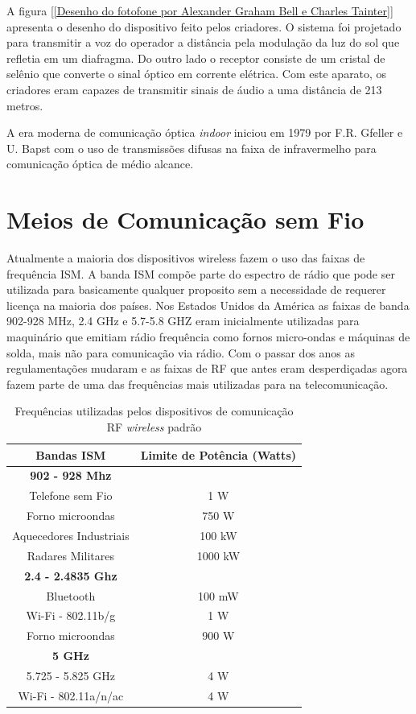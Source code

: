 A figura [\ref{Desenho do fotofone por Alexander Graham Bell e Charles Tainter}] apresenta o desenho do dispositivo feito pelos criadores. O sistema foi projetado para transmitir a voz do operador a distância pela modulação da luz do sol que refletia em um diafragma. Do outro lado o receptor consiste de um cristal de selênio que converte o sinal óptico em corrente elétrica. Com este aparato, os criadores eram capazes de transmitir sinais de áudio a uma distância de 213 metros. \cite{Fotofone}

A era moderna de comunicação óptica \textit{indoor} iniciou em 1979 por F.R. Gfeller e U. Bapst com o uso de transmissões difusas na faixa de infravermelho para comunicação óptica de médio alcance.\cite{Gfeller}


\section{Meios de Comunicação sem Fio}

Atualmente a maioria dos dispositivos wireless fazem o uso das faixas de frequência ISM.
A banda ISM compõe parte do espectro de rádio que pode ser utilizada para basicamente qualquer proposito sem a necessidade de requerer licença na maioria dos países. Nos Estados Unidos da América as faixas de banda 902-928 MHz, 2.4 GHz e 5.7-5.8 GHZ eram inicialmente utilizadas para maquinário que emitiam rádio frequência como fornos micro-ondas e máquinas de solda, mais não para comunicação via rádio.
Com o passar dos anos as regulamentações mudaram e as faixas de RF que antes eram desperdiçadas agora fazem parte de uma das frequências mais utilizadas para na telecomunicação.

\begin{table}[h]
	\centering
	\begin{tabular}{cc}
		\toprule
		\textbf{Bandas ISM} & \textbf{Limite de Potência (Watts)} \\
		\midrule
		\textbf{902 - 928 Mhz} &  \\ \hline
		Telefone sem Fio & 1 W\\
		Forno microondas & 750 W \\
		Aquecedores Industriais & 100 kW\\
		Radares Militares & 1000 kW\\ \hline
		\textbf{2.4 - 2.4835 Ghz}&  \\ \hline
		Bluetooth & 100 mW\\
		Wi-Fi - 802.11b/g & 1 W \\
		Forno microondas & 900 W\\ \hline
		\textbf{5 GHz} & \\ \hline
		5.725 - 5.825 GHz & 4 W\\
		Wi-Fi - 802.11a/n/ac & 4 W \\
		\bottomrule
	\end{tabular}
	\caption{Frequências utilizadas pelos dispositivos de comunicação RF \textit{wireless} padrão \cite{ISM}}
	\label{Tab: frequencias RF}
\end{table}

